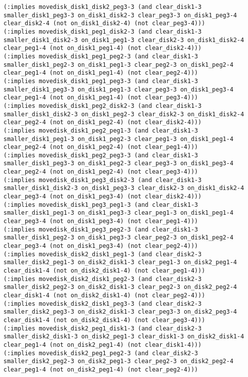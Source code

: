 \documentclass[12pt,letterpaper]{ntdhw}
\begin{document}
\begin{enumerate}
\begin{enumerate}
\begin{lstlisting}[language=pddl, style=pddlstyle,
  basicstyle=\scriptsize]
(:implies movedisk_disk1_disk2_peg3-3 (and clear_disk1-3 smaller_disk1_peg3-3 on_disk1_disk2-3 clear_peg3-3 on_disk1_peg3-4 clear_disk2-4 (not on_disk1_disk2-4) (not clear_peg3-4)))
(:implies movedisk_disk1_peg1_disk2-3 (and clear_disk1-3 smaller_disk1_disk2-3 on_disk1_peg1-3 clear_disk2-3 on_disk1_disk2-4 clear_peg1-4 (not on_disk1_peg1-4) (not clear_disk2-4)))
(:implies movedisk_disk1_peg1_peg2-3 (and clear_disk1-3 smaller_disk1_peg2-3 on_disk1_peg1-3 clear_peg2-3 on_disk1_peg2-4 clear_peg1-4 (not on_disk1_peg1-4) (not clear_peg2-4)))
(:implies movedisk_disk1_peg1_peg3-3 (and clear_disk1-3 smaller_disk1_peg3-3 on_disk1_peg1-3 clear_peg3-3 on_disk1_peg3-4 clear_peg1-4 (not on_disk1_peg1-4) (not clear_peg3-4)))
(:implies movedisk_disk1_peg2_disk2-3 (and clear_disk1-3 smaller_disk1_disk2-3 on_disk1_peg2-3 clear_disk2-3 on_disk1_disk2-4 clear_peg2-4 (not on_disk1_peg2-4) (not clear_disk2-4)))
(:implies movedisk_disk1_peg2_peg1-3 (and clear_disk1-3 smaller_disk1_peg1-3 on_disk1_peg2-3 clear_peg1-3 on_disk1_peg1-4 clear_peg2-4 (not on_disk1_peg2-4) (not clear_peg1-4)))
(:implies movedisk_disk1_peg2_peg3-3 (and clear_disk1-3 smaller_disk1_peg3-3 on_disk1_peg2-3 clear_peg3-3 on_disk1_peg3-4 clear_peg2-4 (not on_disk1_peg2-4) (not clear_peg3-4)))
(:implies movedisk_disk1_peg3_disk2-3 (and clear_disk1-3 smaller_disk1_disk2-3 on_disk1_peg3-3 clear_disk2-3 on_disk1_disk2-4 clear_peg3-4 (not on_disk1_peg3-4) (not clear_disk2-4)))
(:implies movedisk_disk1_peg3_peg1-3 (and clear_disk1-3 smaller_disk1_peg1-3 on_disk1_peg3-3 clear_peg1-3 on_disk1_peg1-4 clear_peg3-4 (not on_disk1_peg3-4) (not clear_peg1-4)))
(:implies movedisk_disk1_peg3_peg2-3 (and clear_disk1-3 smaller_disk1_peg2-3 on_disk1_peg3-3 clear_peg2-3 on_disk1_peg2-4 clear_peg3-4 (not on_disk1_peg3-4) (not clear_peg2-4)))
(:implies movedisk_disk2_disk1_peg1-3 (and clear_disk2-3 smaller_disk2_peg1-3 on_disk2_disk1-3 clear_peg1-3 on_disk2_peg1-4 clear_disk1-4 (not on_disk2_disk1-4) (not clear_peg1-4)))
(:implies movedisk_disk2_disk1_peg2-3 (and clear_disk2-3 smaller_disk2_peg2-3 on_disk2_disk1-3 clear_peg2-3 on_disk2_peg2-4 clear_disk1-4 (not on_disk2_disk1-4) (not clear_peg2-4)))
(:implies movedisk_disk2_disk1_peg3-3 (and clear_disk2-3 smaller_disk2_peg3-3 on_disk2_disk1-3 clear_peg3-3 on_disk2_peg3-4 clear_disk1-4 (not on_disk2_disk1-4) (not clear_peg3-4)))
(:implies movedisk_disk2_peg1_disk1-3 (and clear_disk2-3 smaller_disk2_disk1-3 on_disk2_peg1-3 clear_disk1-3 on_disk2_disk1-4 clear_peg1-4 (not on_disk2_peg1-4) (not clear_disk1-4)))
(:implies movedisk_disk2_peg1_peg2-3 (and clear_disk2-3 smaller_disk2_peg2-3 on_disk2_peg1-3 clear_peg2-3 on_disk2_peg2-4 clear_peg1-4 (not on_disk2_peg1-4) (not clear_peg2-4)))

\end{lstlisting}
\end{enumerate}
\end{enumerate}
\end{document}
